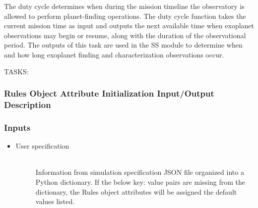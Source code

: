 \documentclass[cleanfoot]{asme2ej}
\begin{document}
The duty cycle determines when during the mission timeline the observatory is allowed to perform planet-finding operations.  The duty cycle function takes the current mission time as input and outputs the next available time when exoplanet observations may begin or resume, along with the duration of the observational period. The outputs of this task are used in the SS module to determine when and how long exoplanet finding and characterization observations occur.  

TASKS:

\label{sec:rules}
\subsubsection{Rules Object Attribute Initialization Input/Output Description}

\subsubsection*{Inputs}
\begin{itemize}
    \item
    \begin{description}
        \item[User specification] \hfill \\
        Information from simulation specification JSON file organized into a Python dictionary. If the below key: value pairs are missing from the dictionary, the Rules object attributes will be assigned the default values listed.
    \end{description}
\end{itemize}
\end{document}
